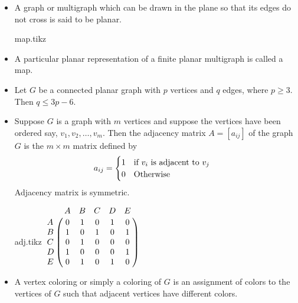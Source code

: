 \documentclass[../main-sheet.tex]{subfiles}
\begin{document}
\begin{itemize}
    By $ k_{m,n} $ we mean that each vertex of $ M $ is connected to each vertex of $ N $, a complete bipartite graph.
    \begin{center}
        {k-2-3.tikz}
    \end{center}
    \item A graph or multigraph which can be drawn in the plane so that its edges do not cross is said to be planar.
    \begin{center}
        {map.tikz}
    \end{center}
    \item A particular planar representation of a finite planar multigraph is called a map. 
    \item Let $ G $ be a connected planar graph with $ p $ vertices and $ q $ edges, where $ p\geq3 $. Then $ q\leq 3p-6 $.
    \item Suppose $ G $ is a graph with $ m $ vertices and suppose the vertices have been ordered say, $ v_1,v_2,\dots,v_m $. Then the adjacency matrix $ A=[a_{ij}] $ of the graph $ G $ is the $ m\times m $ matrix defined by \[a_{ij}=\begin{cases}
        1\quad\text{if $ v_i $ is adjacent to $ v_j $}\\
        0\quad\text{Otherwise}
    \end{cases}\]
    Adjacency matrix is symmetric.
    \begin{center}
        {adj.tikz}
        $ \bordermatrix{~ & A & B & C & D & E \cr
                        A & 0 & 1 & 0 & 1 & 0 \cr
                        B & 1 & 0 & 1 & 0 & 1 \cr
                        C & 0 & 1 & 0 & 0 & 0 \cr
                        D & 1 & 0 & 0 & 0 & 1 \cr
                        E & 0 & 1 & 0 & 1 & 0 \cr
                        } $
    \end{center}
    \item A vertex coloring or simply a coloring of $ G $ is an assignment of colors to the vertices of $ G $ such that adjacent vertices have different colors.


\end{itemize}
\end{document}
